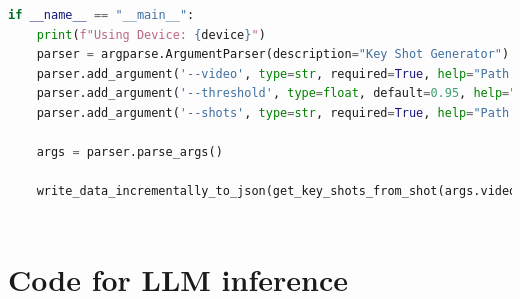 \documentclass[12pt]{report}
\begin{document}
\begin{lstlisting}[language=Python,caption={Key Shot Frame Extraction Code}]
if __name__ == "__main__":
    print(f"Using Device: {device}")
    parser = argparse.ArgumentParser(description="Key Shot Generator")
    parser.add_argument('--video', type=str, required=True, help="Path to video")
    parser.add_argument('--threshold', type=float, default=0.95, help="Cosine Similarity Threshold")
    parser.add_argument('--shots', type=str, required=True, help="Path to shots CSV file")
    
    args = parser.parse_args()
    
    write_data_incrementally_to_json(get_key_shots_from_shot(args.video, args.shots, args.threshold),"key_shots.json")
        

	\end{lstlisting}
	\chapter{Code for LLM inference}\label{app:llm_inference}
\end{document}
